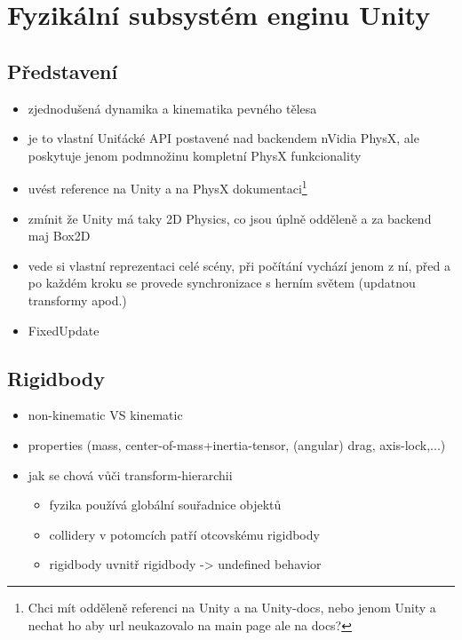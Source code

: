 \section{Fyzikální subsystém enginu Unity}

\subsection{Představení}


\begin{itemize}
    \item zjednodušená dynamika a kinematika pevného tělesa
    \item je to vlastní Uniťácké API postavené nad backendem nVidia PhysX, ale poskytuje jenom podmnožinu kompletní PhysX funkcionality
    \item uvést reference na Unity a na PhysX dokumentaci\footnote{Chci mít odděleně referenci na Unity a na Unity-docs, nebo jenom Unity a nechat ho aby url neukazovalo na main page ale na docs?}
    \item zmínit že Unity má taky 2D Physics, co jsou úplně odděleně a za backend maj Box2D 
    \item vede si vlastní reprezentaci celé scény, při počítání vychází jenom z ní, před a po každém kroku se provede synchronizace s herním světem (updatnou transformy apod.)
    \item FixedUpdate
\end{itemize}


\subsection{Rigidbody}
\begin{itemize}
    \item non-kinematic VS kinematic
    \item properties (mass, center-of-mass+inertia-tensor, (angular) drag, axis-lock,...)
    \item jak se chová vůči transform-hierarchii
          \begin{itemize}
            \item fyzika používá globální souřadnice objektů
            \item collidery v potomcích patří otcovskému rigidbody
            \item rigidbody uvnitř rigidbody -> undefined behavior
          \end{itemize}
\end{itemize}

